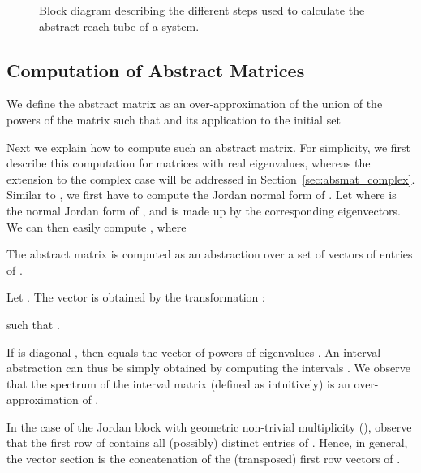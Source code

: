 \documentclass{IEEEtran}
\begin{document}
\begin{figure}
{
}
\caption{Block diagram describing the different steps used to calculate the abstract reach tube of a system.}
\label{fig:procedure}
\end{figure}
\subsection{Computation of Abstract Matrices}\label{sec:absmat_real}


We define the abstract matrix  as an over-approximation
of the union of the powers of the matrix  such that  and its application to the initial set 

Next we explain how to compute such an abstract matrix.
For simplicity, we first describe this computation for matrices  with real eigenvalues, 
whereas the extension to the complex case will be addressed in Section~\ref{sec:absmat_complex}. 
Similar to \cite{JSS14}, we first have to compute the Jordan normal form of .
Let  where  is the normal Jordan form of , 
and  is made up by the corresponding eigenvectors. 
We can then easily compute , where 

The abstract matrix  is computed as an abstraction over 
a set of vectors  of entries of . 

Let . 
The vector  is obtained by the transformation :

such that 
. 

If  is diagonal \cite{JSS14}, then  equals the
vector of powers of eigenvalues .
An interval abstraction can thus be simply obtained by computing the
intervals
 .
We observe that the spectrum of the interval matrix  (defined as intuitively) 
is an over-approximation of .

In the case of the  Jordan block  with geometric non-trivial
multiplicity  (), observe that
the first row of  contains all (possibly) distinct
entries of .  Hence, in general, the vector section  is
the concatenation of the (transposed) first row vectors
 of .
\end{document}
